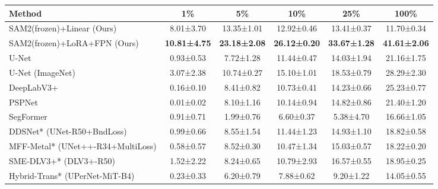 \begin{tabular}{lccccc}
\toprule
Method & 1\% & 5\% & 10\% & 25\% & 100\% \\
\midrule
SAM2(frozen)+Linear (Ours) & 8.01±3.70 & 13.35±1.01 & 12.92±0.46 & 13.41±0.37 & 11.70±0.34 \\
SAM2(frozen)+LoRA+FPN (Ours) & \textbf{10.81±4.75} & \textbf{23.18±2.08} & \textbf{26.12±0.20} & \textbf{33.67±1.28} & \textbf{41.61±2.06} \\
\midrule
U-Net & 0.93±0.53 & 7.72±1.28 & 11.44±0.47 & 14.03±1.94 & 21.16±1.75 \\
U-Net (ImageNet) & 3.07±2.38 & 10.74±0.27 & 15.10±1.01 & 18.53±0.79 & 28.29±2.30 \\
DeepLabV3+ & 0.16±0.10 & 8.41±0.82 & 10.73±0.41 & 14.23±0.66 & 25.23±0.77 \\
PSPNet & 0.01±0.02 & 8.10±1.16 & 10.14±0.94 & 14.82±0.86 & 21.40±1.20 \\
SegFormer & 0.91±0.71 & 1.99±0.76 & 6.60±0.37 & 5.38±4.70 & 16.66±1.05 \\
\midrule
DDSNet* (UNet-R50+BndLoss) & 0.99±0.66 & 8.55±1.54 & 11.44±1.23 & 14.93±1.10 & 18.82±0.58 \\
MFF-Metal* (UNet++-R34+MultiLoss) & 0.58±0.57 & 8.52±0.30 & 10.47±1.34 & 15.03±0.57 & 18.22±0.20 \\
SME-DLV3+* (DLV3+-R50) & 1.52±2.22 & 8.24±0.65 & 10.79±2.93 & 16.57±0.55 & 18.95±0.25 \\
Hybrid-Trans* (UPerNet-MiT-B4) & 0.23±0.33 & 6.20±0.79 & 7.88±0.62 & 9.20±1.22 & 14.05±0.55 \\
\bottomrule
\end{tabular}
